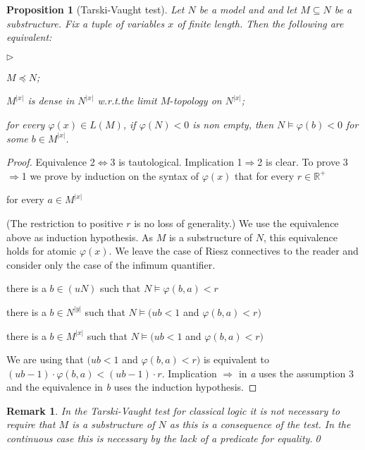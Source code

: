 \documentclass[12pt,letterpaper,oneside,reqno]{amsart}
\newcommand{\mylabel}[1]{{#1}\hfill}
\renewenvironment{itemize}
  {\begin{list}{$\triangleright$}{%
   \setlength{\parskip}{0mm}
   \setlength{\topsep}{.2\baselineskip}
   \setlength{\rightmargin}{0mm}
   \setlength{\listparindent}{0mm}
   \setlength{\itemindent}{0mm}
   \setlength{\labelwidth}{3ex}
   \setlength{\itemsep}{.2\baselineskip}
   \setlength{\parsep}{.2\baselineskip}
   \setlength{\partopsep}{0mm}
   \setlength{\labelsep}{1ex}
   \setlength{\leftmargin}{\labelwidth+\labelsep}
   \let\makelabel\mylabel}}{%
   \end{list}}
\theoremstyle{plain}
\newtheorem{proposition}[theorem]{Proposition}
\newtheorem{remark}[theorem]{Remark}
\theoremstyle{remark}
\begin{document}
\begin{proposition}[Tarski-Vaught test]\label{prop_Tarski-Vaught} Let $N$ be a model and and let $M\subseteq N$ be a substructure. 
Fix a tuple of variables $x$ of finite length.
Then the following are equivalent:
\begin{itemize}
\item[1.] $M\preceq N$;
\item[2.] $M^{|x|}$ is dense in $N^{|x|}$ w.r.t.\@ the limit $M\mbox{-}$topology on $N^{|x|}$;
\item[3.] for every $\varphi(x)\in L(M)$, if $\varphi(N)<0$ is non empty, then $N\models\varphi(b)<0$ for some $b\in M^{|x|}$.
\end{itemize}
\end{proposition}
\begin{proof}
  Equivalence 2$\Leftrightarrow$3 is tautological.
  Implication 1$\Rightarrow$2 is clear.
  To prove 3$\Rightarrow$1 we prove by induction on the syntax of $\varphi(x)$ that for every $r\in{\mathds R}^+$

   \hfill for every $a\in M^{|x|}$
  
  (The restriction to positive $r$ is no loss of generality.)
  We use the equivalence above as induction hypothesis.
  As $M$ is a substructure of $N$, this equivalence holds for atomic $\varphi(x)$.
  We leave the case of Riesz connectives to the reader and consider only the case of the infimum quantifier.

   there is a $b\in(uN)$ such that $N\models\varphi(b,a)<r$

  \ceq{}{\Leftrightarrow}{} there is a $b\in N^{|y|}$ such that $N\models (ub<1$ and $\varphi(b,a)<r)$

   there is a $b\in M^{|x|}$ such that $N\models (ub<1$ and $\varphi(b,a)<r)$


We are using that $(ub<1$ and $\varphi(b,a)<r)$ is equivalent to $(ub-1)\cdot\varphi(b,a)<(ub-1)\cdot r$.
Implication $\Rightarrow$ in \textit{a} uses the assumption 3 and the equivalence in \textit{b} uses the induction hypothesis.
\end{proof}

\begin{remark}
In the Tarski-Vaught test for classical logic it is not necessary to require that $M$ is a substructure of $N$ as this is a consequence of the test.
In the continuous case this is necessary by the lack of a predicate for equality.\qed
\end{remark}
\end{document}
